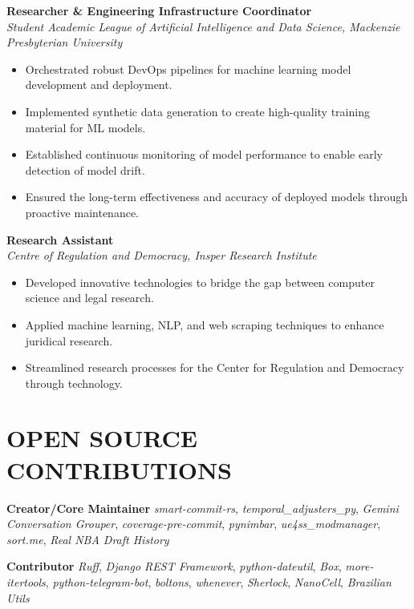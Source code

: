 \documentclass[a4paper,9pt]{extarticle}
\begin{document}
\noindent
\textbf{Researcher \& Engineering Infrastructure Coordinator} \\
\textit{Student Academic League of Artificial Intelligence and Data Science, Mackenzie Presbyterian University}
\begin{itemize}[leftmargin=*]
    \item Orchestrated robust DevOps pipelines for machine learning model development and deployment.
    \item Implemented synthetic data generation to create high-quality training material for ML models.
    \item Established continuous monitoring of model performance to enable early detection of model drift.
    \item Ensured the long-term effectiveness and accuracy of deployed models through proactive maintenance. \\
\end{itemize}

\noindent
\textbf{Research Assistant} \\
\textit{Centre of Regulation and Democracy, Insper Research Institute}
\begin{itemize}[leftmargin=*]
    \item Developed innovative technologies to bridge the gap between computer science and legal research.
    \item Applied machine learning, NLP, and web scraping techniques to enhance juridical research.
    \item Streamlined research processes for the Center for Regulation and Democracy through technology.
\end{itemize}


\section*{OPEN SOURCE CONTRIBUTIONS}

\noindent \textbf{Creator/Core Maintainer} \textit{smart-commit-rs}, \textit{temporal\_adjusters\_py}, \textit{Gemini Conversation Grouper}, \textit{coverage-pre-commit}, \textit{pynimbar}, \textit{ue4ss\_modmanager}, \textit{sort.me}, \textit{Real NBA Draft History}

\noindent \textbf{Contributor} \textit{Ruff}, \textit{Django REST Framework}, \textit{python-dateutil}, \textit{Box}, \textit{more-itertools}, \textit{python-telegram-bot}, \textit{boltons}, \textit{whenever}, \textit{Sherlock}, \textit{NanoCell}, \textit{Brazilian Utils}
\end{document}
